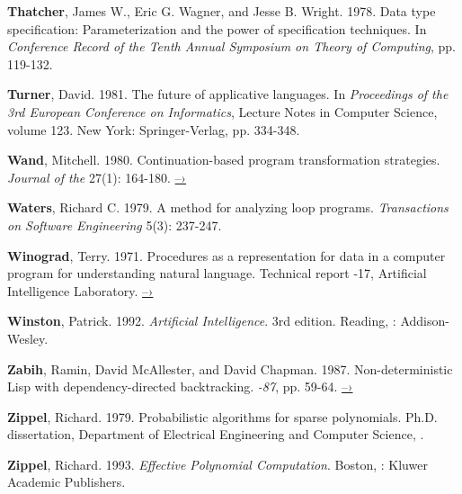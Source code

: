  \label{Thatcher et al. 1978}
\textbf{Thatcher}, James W., Eric G. Wagner, and Jesse B. Wright. 1978.  Data type
specification: Parameterization and the power of specification techniques. In
\textit{Conference Record of the Tenth Annual  Symposium on Theory
of Computing}, pp. 119-132.

 \label{Turner 1981}
\textbf{Turner}, David.  1981.  The future of applicative languages.  In
\textit{Proceedings of the 3rd European Conference on Informatics}, Lecture Notes
in Computer Science, volume 123. New York: Springer-Verlag, pp.  334-348.

 \label{Wand 1980}
\textbf{Wand}, Mitchell.  1980.  Continuation-based program transformation strategies.
\textit{Journal of the } 27(1): 164-180.
\href{http://www.diku.dk/OLD/undervisning/2005e/224/papers/Wand80.pdf}{–›}

 \label{Waters (1979)}
\textbf{Waters}, Richard C.  1979.  A method for analyzing loop programs.
\textit{ Transactions on Software Engineering} 5(3): 237-247.

\textbf{Winograd}, Terry.  1971.  Procedures as a representation for data in a computer
program for understanding natural language.  Technical report -17,
 Artificial Intelligence Laboratory.
\href{http://dspace.mit.edu/handle/1721.1/7095}{–›}

 \label{Winston 1992}
\textbf{Winston}, Patrick. 1992. \textit{Artificial Intelligence}.  3rd edition.  Reading,
: Addison-Wesley.

 \label{Zabih et al. 1987}
\textbf{Zabih}, Ramin, David McAllester, and David Chapman.  1987.  Non-deterministic
Lisp with dependency-directed backtracking.  \textit{-87},
pp. 59-64.
\href{http://www.aaai.org/Papers/AAAI/1987/AAAI87-011.pdf}{–›}

 \label{Zippel (1979)}
\textbf{Zippel}, Richard.  1979.  Probabilistic algorithms for sparse polynomials.
Ph.D. dissertation, Department of Electrical Engineering and Computer Science,
.

 \label{Zippel 1993}
\textbf{Zippel}, Richard.  1993.  \textit{Effective Polynomial Computation}.  Boston, :
Kluwer Academic Publishers.

